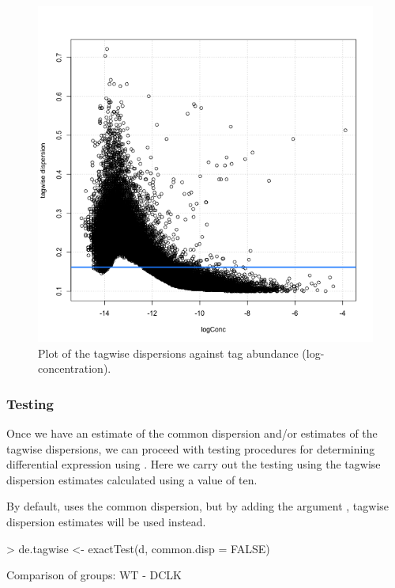 \begin{figure}[ht]
\begin{center}
\includegraphics[height=0.45\textheight]{edgeR_case_study_tHoen_tgw_disp_vs_logconc.png}
\caption{Plot of the tagwise dispersions against tag abundance (log-concentration).}
\label{fig:longSAGE-tgw-disp-vs-logconc}
\end{center}
\end{figure}


\subsubsection{Testing}
Once we have an estimate of the common dispersion and/or estimates of
the tagwise dispersions, we can proceed with testing procedures for
determining differential expression using . Here we
carry out the testing using the tagwise dispersion estimates
calculated using a  value of ten.

By default,  uses the common dispersion, but by adding
the argument , tagwise dispersion estimates
will be used instead.

\begin{Schunk}
\begin{Sinput}
> de.tagwise <- exactTest(d, common.disp = FALSE)
\end{Sinput}
\begin{Soutput}
Comparison of groups:  WT - DCLK 
\end{Soutput}
\end{Schunk}

